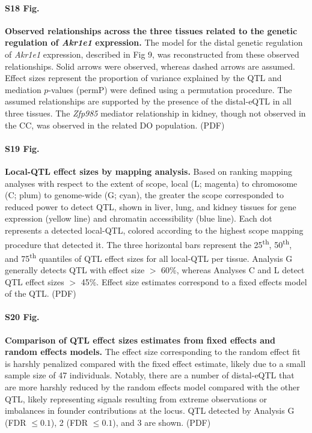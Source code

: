 \documentclass[10pt,letterpaper]{article}
\begin{document}
\paragraph*{S18 Fig.}
\label{S_akr1e1_relationships}
{\bf Observed relationships across the three tissues related to the genetic regulation of \textit{Akr1e1} expression.}
The model for the distal genetic regulation of \textit{Akr1e1} expression, described in Fig 9, was reconstructed from these observed relationships. Solid arrows were observed, whereas dashed arrows are assumed. Effect sizes represent the proportion of variance explained by the QTL and mediation $p$-values (permP) were defined using a permutation procedure. The assumed relationships are supported by the presence of the distal-eQTL in all three tissues. The \textit{Zfp985} mediator relationship in kidney, though not observed in the CC, was observed in the related DO population. (PDF)

\paragraph*{S19 Fig.}
\label{S_qtl_effect_sizes_by_method}
{\bf Local-QTL effect sizes by mapping analysis.}
Based on ranking mapping analyses with respect to the extent of scope, local (L; magenta) to chromosome (C; plum) to genome-wide (G; cyan), the greater the scope corresponded to reduced power to detect QTL, shown in liver, lung, and kidney tissues for gene expression (yellow line) and chromatin accessibility (blue line). Each dot represents a detected local-QTL, colored according to the highest scope mapping procedure that detected it. The three horizontal bars represent the 25\textsuperscript{th}, 50\textsuperscript{th}, and 75\textsuperscript{th} quantiles of QTL effect sizes for all local-QTL per tissue. Analysis G generally detects QTL with effect size $>$ 60\%, whereas Analyses C and L detect QTL effect sizes $>$ 45\%. Effect size estimates correspond to a fixed effects model of the QTL. (PDF)

\paragraph*{S20 Fig.}
\label{S_qtl_effect_size_fixefvsranef}
{\bf Comparison of QTL effect sizes estimates from fixed effects and random effects models.}
The effect size corresponding to the random effect fit is harshly penalized compared with the fixed effect estimate, likely due to a small sample size of 47 individuals. Notably, there are a number of distal-eQTL that are more harshly reduced by the random effects model compared with the other QTL, likely representing signals resulting from extreme observations or imbalances in founder contributions at the locus. QTL detected by Analysis G (FDR $\le 0.1$), 2 (FDR $\le 0.1$), and 3 are shown. (PDF)
\end{document}
